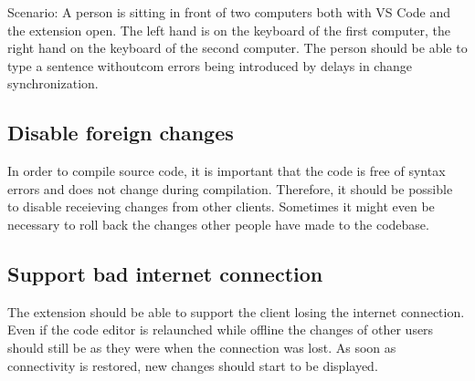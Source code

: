 Scenario: A person is sitting in front of two computers both with VS Code and the extension open. The left hand is on the keyboard of the first computer, the right hand on the keyboard of the second computer. The person should be able to type a sentence withoutcom errors being introduced by delays in change synchronization.

\subsection{Disable foreign changes}

In order to compile source code, it is important that the code is free of syntax errors and does not change during compilation. Therefore, it should be possible to disable receieving changes from other clients. Sometimes it might even be necessary to roll back the changes other people have made to the codebase.

\subsection{Support bad internet connection}

The extension should be able to support the client losing the internet connection. Even if the code editor is relaunched while offline the changes of other users should still be as they were when the connection was lost. As soon as connectivity is restored, new changes should start to be displayed. 